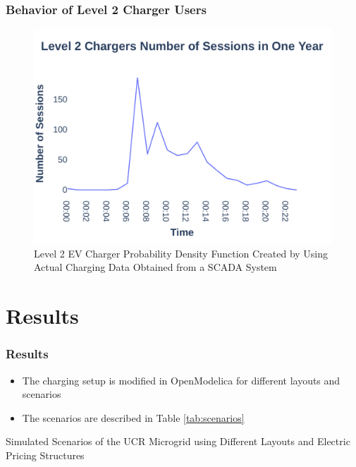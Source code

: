 \documentclass[aspectratio=169, 8 pt]{beamer}
\begin{document}
	\begin{frame}
			\frametitle{Behavior of Level 2 Charger Users}
			\begin{figure}
			\centering
			\includegraphics[width=0.7\linewidth]{Fig/Option_3/l2_avg_day_rand_poisson_1_hour_real.pdf}
			\caption{\footnotesize  Level 2 EV Charger Probability Density Function  Created  by Using Actual Charging Data Obtained from a SCADA System}
			\label{fig:l2avgdayrandpoisson1hourpdf}
		\end{figure}
	\end{frame}

\section{Results}	
		
		\begin{frame}
			\frametitle{Results}
			\begin{itemize}
				\item The charging setup is modified in OpenModelica for different layouts and scenarios
				\item The scenarios are described in Table \ref{tab:scenarios}
			\end{itemize}
			
			\begin{table}
				\caption{Simulated Scenarios of the UCR Microgrid using Different Layouts and Electric Pricing Structures}
				\large
				
				\label{tab:scenarios}
			\end{table}
		\end{frame}
			
\end{document}
